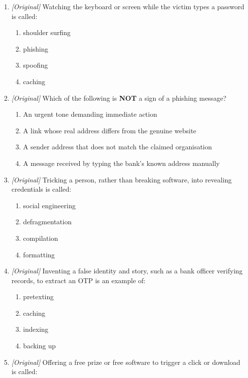 \documentclass[11pt]{article}
\begin{document}
\begin{enumerate}[label=\textbf{Q\arabic*.}, leftmargin=*]
\begin{enumerate}[label=\Alph*.]
    \item cache refresh
  \end{enumerate}
\item \textit{[Original]} Watching the keyboard or screen while the victim
  types a password is called:
  \begin{enumerate}[label=\Alph*.]
    \item shoulder surfing
    \item phishing
    \item spoofing
    \item caching
  \end{enumerate}
\item \textit{[Original]} Which of the following is \textbf{NOT} a sign of
  a phishing message?
  \begin{enumerate}[label=\Alph*.]
    \item An urgent tone demanding immediate action
    \item A link whose real address differs from the genuine website
    \item A sender address that does not match the claimed organisation
    \item A message received by typing the bank's known address manually
  \end{enumerate}
\item \textit{[Original]} Tricking a person, rather than breaking software,
  into revealing credentials is called:
  \begin{enumerate}[label=\Alph*.]
    \item social engineering
    \item defragmentation
    \item compilation
    \item formatting
  \end{enumerate}
\item \textit{[Original]} Inventing a false identity and story, such as a
  bank officer verifying records, to extract an OTP is an example of:
  \begin{enumerate}[label=\Alph*.]
    \item pretexting
    \item caching
    \item indexing
    \item backing up
  \end{enumerate}
\item \textit{[Original]} Offering a free prize or free software to trigger
  a click or download is called:
  \begin{enumerate}[label=\Alph*.]

\end{enumerate}
\end{enumerate}
\end{document}
